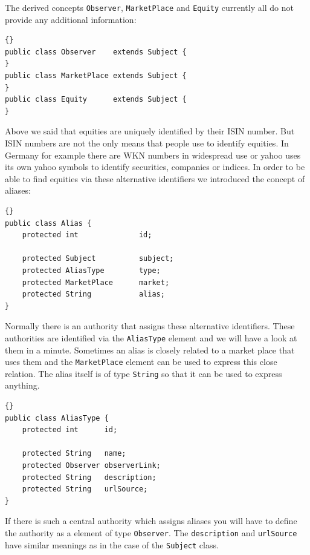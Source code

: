 \documentclass[a4paper,fleqn]{article}
\begin{document}
The derived concepts \lstinline!Observer!, \lstinline!MarketPlace! and
\lstinline!Equity! currently all do not provide any additional
information:
\begin{lstlisting}[frame=trbl]{}
public class Observer    extends Subject {
}
public class MarketPlace extends Subject {
}
public class Equity      extends Subject {
}
\end{lstlisting}

Above we said that equities are uniquely identified by their ISIN
number. But ISIN numbers are not the only means that people use to
identify equities. In Germany for example there are WKN numbers in
widespread use or yahoo uses its own yahoo symbols to identify
securities, companies or indices. In order to be able to find equities
via these alternative identifiers we introduced the concept of aliases:
\begin{lstlisting}[frame=trbl]{}
public class Alias {
	protected int              id;
	
	protected Subject          subject;
	protected AliasType        type;
	protected MarketPlace      market;
	protected String           alias;
}
\end{lstlisting}
Normally there is an authority that assigns these alternative
identifiers. These authorities are identified via the
\lstinline!AliasType! element and we will have a look at them in a
minute. Sometimes an alias is closely related to a market place that
uses them and the \lstinline!MarketPlace! element can be used to
express this close relation. The alias itself is of type
\lstinline!String! so that it can be used to express anything.

\begin{lstlisting}[frame=trbl]{}
public class AliasType {
	protected int      id;

	protected String   name;
	protected Observer observerLink;
	protected String   description;
	protected String   urlSource;
}
\end{lstlisting}
If there is such a central authority which assigns aliases you will
have to define the authority as a element of type
\lstinline!Observer!. The \lstinline!description! and
\lstinline!urlSource! have similar meanings as in the case of the
\lstinline!Subject! class.
\end{document}
